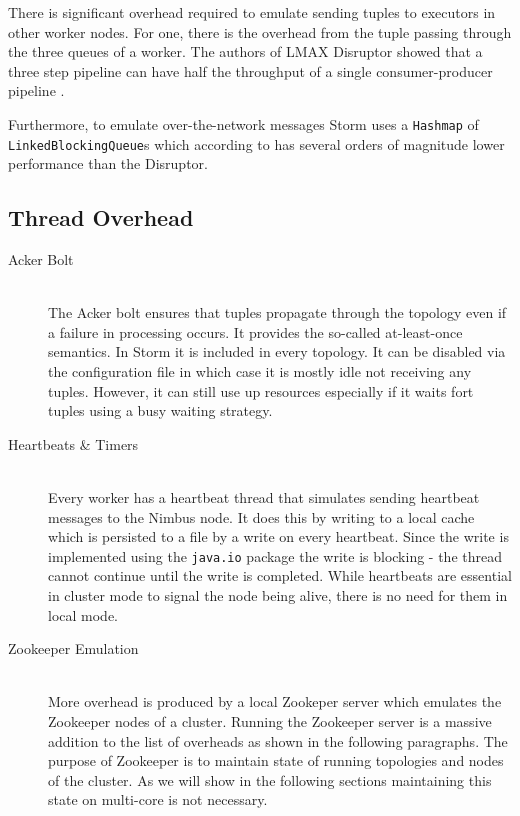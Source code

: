 \documentclass[bsc,logo,frontabs,twoside,singlespacing,normalheadings,parskip]{infthesis}\usepackage[]{graphicx}\usepackage[]{color}
\begin{document}
There is significant overhead required to emulate sending tuples to executors in other worker nodes. For one, there is the overhead from the tuple passing through the three queues of a worker. The authors of LMAX Disruptor showed that a three step pipeline can have half the throughput of a single consumer-producer pipeline \citep{DisruptorWiki}.

Furthermore, to emulate over-the-network messages Storm uses a \texttt{Hashmap} of \texttt{LinkedBlockingQueue}s which according to \cite{Thompson_Farley_Barker_Gee_Stewart_2011} has several orders of magnitude lower performance than the Disruptor. 

\subsection{Thread Overhead}

\begin{description}
	\item[Acker Bolt] \hfill \\
	The Acker bolt ensures that tuples propagate through the topology even if a failure in processing occurs. It provides the so-called at-least-once semantics. In Storm it is included in every topology. It can be disabled via the configuration file in which case it is mostly idle not receiving any tuples. However, it can still use up resources especially if it waits fort tuples using a busy waiting strategy.
	\item[Heartbeats \& Timers] \hfill \\
	Every worker has a heartbeat thread that simulates sending heartbeat messages to the Nimbus node. It does this by writing to a local cache which is persisted to a file by a write on every heartbeat. Since the write is implemented using the \texttt{java.io} package the write is blocking - the thread cannot continue until the write is completed. While heartbeats are essential in cluster mode to signal the node being alive, there is no need for them in local mode.
	\item[Zookeeper Emulation] \hfill \\
	More overhead is produced by a local Zookeper server which emulates the Zookeeper nodes of a cluster. Running the Zookeeper server is a massive addition to the list of overheads as shown in the following paragraphs. The purpose of Zookeeper is to maintain state of running topologies and nodes of the cluster. As we will show in the following sections maintaining this state on multi-core is not necessary.
\end{description}
\end{document}

